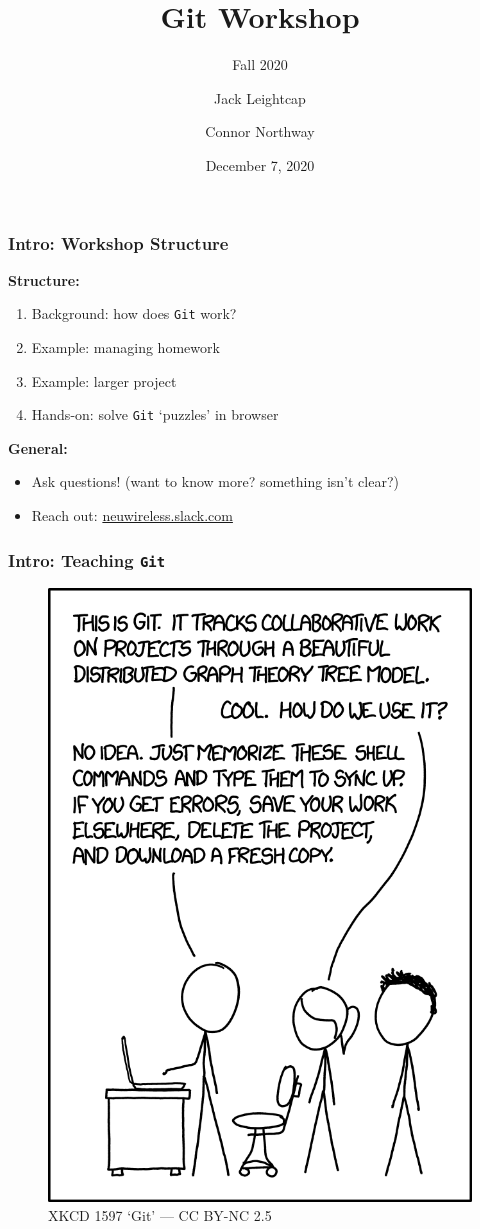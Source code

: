 \documentclass{beamer} \usetheme{Madrid}
\title{Git Workshop}
\subtitle{Fall 2020}
\author[]{Jack Leightcap\inst{1}\inst{2} \and Connor Northway\inst{2}}
\institute[IEEE, Wireless Club]{
    \inst{1}IEEE -- \url{nuieeeofficers@gmail.com}
    \and
    \inst{2}Wireless Club -- \url{nuwirelessclub@gmail.com}
}
\date[Fall 2020]{December 7, 2020}
\begin{document}
\frame{\titlepage}

\begin{frame}
    \frametitle{Intro: Workshop Structure}
    \centering \textbf{Structure:}
    \begin{enumerate}
        \setlength\itemsep{1em}
        \item Background: how does \texttt{Git} work?
        \item Example: managing homework
        \item Example: larger project
        \item Hands-on: solve \texttt{Git} `puzzles' in browser
    \end{enumerate}
    \vfill
    \centering \textbf{General:}
    \begin{itemize}
        \setlength\itemsep{1em}
        \item Ask questions!
              (want to know more? something isn't clear?)
        \item Reach out: \url{neuwireless.slack.com}
    \end{itemize}
\end{frame}

\begin{frame}
    \frametitle{Intro: Teaching \texttt{Git}}
    \begin{figure}
        \includegraphics[height=\textheight-25mm]{xkcd.png}
        \caption{XKCD 1597 `Git' --- CC BY-NC 2.5}
    \end{figure}
\end{frame}
\end{document}
